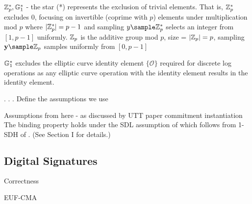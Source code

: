 $\mathbb{Z}_p^*, \mathbb{G}_1^*$ - the star (*) represents the exclusion of trivial elements. That is, $\mathbb{Z}_p^*$ excludes 0, focusing on invertible (coprime with $p$) elements under multiplication mod $p$ where $|\mathbb{Z}_p^*| = p-1$ and sampling $y \sample \Z_p^*$ selects an integer from $[1, p-1]$ uniformly. $\mathbb{Z}_p$ is the additive group mod $p$, size = $|\mathbb{Z}_p| = p$, sampling $\y \sample \Z_p$ samples uniformly from $[0, p-1]$

$\mathbb{G}_1^*$ excludes the elliptic curve identity element $\{\mathcal{O}\}$ required for discrete log operations as any elliptic curve operation with the identity element results in the identity element. 



\begin{definition}
    
\end{definition}


\begin{definition}
    
\end{definition}


\begin{definition}
    
\end{definition}

.
.
.
Define the assumptions we use

\begin{definition}[q-sdh]
    
\end{definition}

Assumptions from here - as discussed by UTT paper commitment instantiation
The binding property holds under the SDL assumption of \cite{hutchison_get_2010}
which follows from 1-SDH of \cite{boneh_short_2008}. (See Section I for details.) 





\subsection{Digital Signatures}

\begin{definition}[Correctness]
    Correctness
\end{definition}



\begin{definition}
    EUF-CMA
\end{definition}







